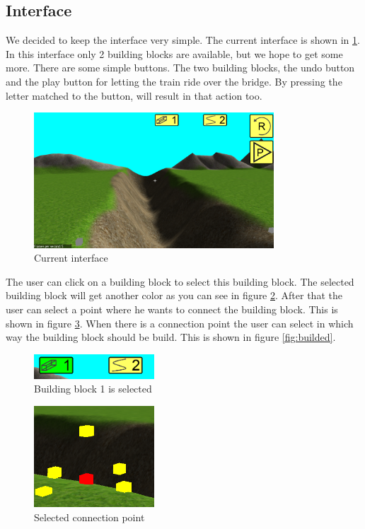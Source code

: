 \subsection{Interface}
We decided to keep the interface very simple. The current interface is shown in \ref{fig:gui}. In this interface only 2 building blocks are available, but we hope to get some more. There are some simple buttons. The two building blocks, the undo button and the play button for letting the train ride over the bridge. By pressing the letter matched to the button, will result in that action too.
\begin{figure}[H]
    \centering
    \includegraphics[width=0.8\textwidth]{screenshots/GUI.png}
    \caption{Current interface}
    \label{fig:gui}
\end{figure}
The user can click on a building block to select this building block. The selected building block will get another color as you can see in figure \ref{fig:bbs}. After that the user can select a point where he wants to connect the building block. This is shown in figure \ref{fig:scp}. When there is a connection point the user can select in which way the building block should be build. This is shown in figure \ref{fig:builded}.
\begin{figure}[H]
    \centering
    \includegraphics[width=0.4\textwidth]{screenshots/BuildingBlockSelected.png}
    \caption{Building block 1 is selected}
    \label{fig:bbs}
\end{figure}
\begin{figure}[H]
    \centering
    \includegraphics[width=0.4\textwidth]{screenshots/select.png}
    \caption{Selected connection point}
    \label{fig:scp}
\end{figure}
